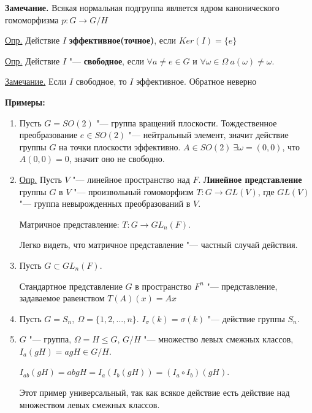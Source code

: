 \documentclass{article}
\begin{document}
\textbf{Замечание.} Всякая нормальная подгруппа является ядром канонического гомоморфизма $p: G \rightarrow G/H$

\vspace{5pt}

\underline{Опр.} Действие $I$ \textbf{эффективное(точное)}, если $Ker(I) = \{e\}$

\vspace{5pt}


\underline{Опр.} Действие $I$ "--- \textbf{свободное}, если $\forall a \neq e \in G$ и $\forall \omega \in \Omega \  a(\omega) \neq \omega$.

\vspace{5pt}

\underline{Замечание.} Если $I$ свободное, то $I$ эффективное. Обратное неверно

\vspace{5pt}

\textbf{Примеры:}
\begin{enumerate}
	\item Пусть $G = SO(2)$ "--- группа вращений плоскости. Тождественное преобразование $e \in SO(2)$ "--- нейтральный элемент, значит действие группы $G$ на точки плоскости эффективно. $A \in SO(2) \  \exists \omega = (0, 0)$, что $A(0, 0) = 0$, значит оно не свободно.

	\item \underline{Опр.} Пусть $V$ "--- линейное пространство над $F$. \textbf{Линейное представление} группы $G$ в $V$ "--- произвольный гомоморфизм $T: G \rightarrow GL(V)$, где $GL(V)$ "--- группа невырожденных преобразований в $V$.

Матричное представление: $T: G \rightarrow GL_n(F)$.

Легко видеть, что матричное представление "--- частный случай действия.
	
	\item Пусть $G \subset GL_n(F)$.
	
	Стандартное представление $G$ в пространство $F^n$ "--- представление, задаваемое равенством $T(A)(x) = Ax$
	\item Пусть $G = S_n, \  \Omega = \{1, 2, ..., n\}$. $I_{\sigma}(k) = \sigma(k)$ "--- действие группы $S_n$.
	\item $G$ "--- группа, $\Omega = H \leq G$, $G/H$ "--- множество левых смежных классов, $I_a(gH) = agH \in G/H$.
	
	$I_{ab}(gH) = abgH = I_a(I_b(gH)) = (I_a \circ I_b)(gH)$.
	
	Этот пример универсальный, так как всякое действие есть действие над множеством левых смежных классов.
\end{enumerate} 
\end{document}
